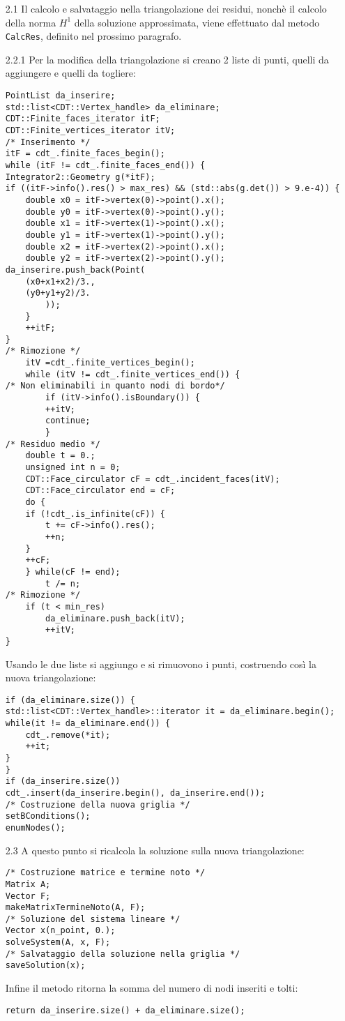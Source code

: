 \documentclass[a4paper,10pt,twoside]{amsart}
\theoremstyle{remark}
\theoremstyle{definition}
\renewcommand{\tt}{\texttt}
\begin{document}
\begin{itemize}
\item[2.1] Il calcolo e salvataggio nella triangolazione dei residui, nonchè il calcolo della norma $H^1$ della soluzione approssimata, viene effettuato dal metodo \tt{CalcRes}, definito nel prossimo paragrafo.
\item[2.2.1] Per la modifica della triangolazione si creano 2 liste di punti, quelli da aggiungere e quelli da togliere:
\begin{lstlisting}
PointList da_inserire;
std::list<CDT::Vertex_handle> da_eliminare;
CDT::Finite_faces_iterator itF;
CDT::Finite_vertices_iterator itV;
/* Inserimento */
itF = cdt_.finite_faces_begin();
while (itF != cdt_.finite_faces_end()) {
Integrator2::Geometry g(*itF);
if ((itF->info().res() > max_res) && (std::abs(g.det()) > 9.e-4)) {
	double x0 = itF->vertex(0)->point().x(); 
	double y0 = itF->vertex(0)->point().y();
	double x1 = itF->vertex(1)->point().x(); 
	double y1 = itF->vertex(1)->point().y();
	double x2 = itF->vertex(2)->point().x(); 
	double y2 = itF->vertex(2)->point().y();
da_inserire.push_back(Point(
	(x0+x1+x2)/3.,
	(y0+y1+y2)/3.
		));	
	}
	++itF;
}
/* Rimozione */
	itV =cdt_.finite_vertices_begin();
	while (itV != cdt_.finite_vertices_end()) {
/* Non eliminabili in quanto nodi di bordo*/
		if (itV->info().isBoundary()) {
		++itV;
		continue;
		}
/* Residuo medio */
	double t = 0.;
	unsigned int n = 0;
	CDT::Face_circulator cF = cdt_.incident_faces(itV);
	CDT::Face_circulator end = cF;
	do {
	if (!cdt_.is_infinite(cF)) {
		t += cF->info().res();
		++n;
	}
	++cF;
	} while(cF != end);
		t /= n;
/* Rimozione */
	if (t < min_res)
		da_eliminare.push_back(itV);
		++itV;
}
\end{lstlisting}
Usando le due liste si aggiungo e si rimuovono i punti, costruendo così la nuova triangolazione:
\begin{lstlisting}
if (da_eliminare.size()) {
std::list<CDT::Vertex_handle>::iterator it = da_eliminare.begin();
while(it != da_eliminare.end()) {
	cdt_.remove(*it);
	++it;
} 
}
if (da_inserire.size())
cdt_.insert(da_inserire.begin(), da_inserire.end());
/* Costruzione della nuova griglia */
setBConditions();
enumNodes();
\end{lstlisting}
\item[2.3] A questo punto si ricalcola la soluzione sulla nuova triangolazione:
\begin{lstlisting}
/* Costruzione matrice e termine noto */
Matrix A;
Vector F;	
makeMatrixTermineNoto(A, F);
/* Soluzione del sistema lineare */
Vector x(n_point, 0.);
solveSystem(A, x, F);
/* Salvataggio della soluzione nella griglia */
saveSolution(x);
\end{lstlisting} 
Infine il metodo ritorna la somma del numero di nodi inseriti e tolti:
\begin{lstlisting}
return da_inserire.size() + da_eliminare.size();
\end{lstlisting}
\end{itemize}
\end{document}
